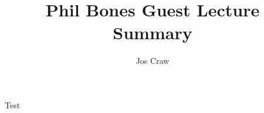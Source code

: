 \documentclass{article}
\title{Phil Bones Guest Lecture Summary}
\author{Jos Craw}
\begin{document}
\maketitle{}
Test
\end{document}
